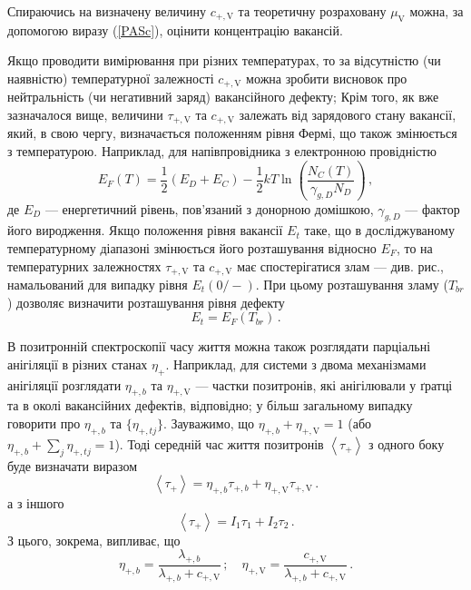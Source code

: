 \documentclass[10pt,a5paper,titlepage,oneside]{book}
\numberwithin{equation}{part}
\begin{document}
Спираючись на визначену величину $c_{+,\mathrm{V}}$ та теоретичну розраховану $\mu_\mathrm{V}$ можна,
за допомогою виразу (\ref{PASc}), оцінити концентрацію вакансій.

Якщо проводити вимірювання при різних температурах, то
за відсутністю (чи наявністю) температурної залежності $c_{+,\mathrm{V}}$ можна зробити
висновок про нейтральність (чи негативний заряд) вакансійного дефекту;
Крім того, як вже зазначалося вище, величини $\tau_{+,\mathrm{V}}$ та $c_{+,\mathrm{V}}$ залежать від зарядового стану
вакансії, який, в свою чергу, визначається положенням рівня Фермі, що також змінюється з температурою.
Наприклад, для напівпровідника з електронною провідністю
\begin{equation}\label{EF}
E_F(T)=\frac{1}{2}(E_D+E_C)-\frac{1}{2}kT\ln\left(\frac{N_C(T)}{\gamma_{g,D}N_D}\right)\,,
\end{equation}
де
$E_D$ --- енергетичний рівень, пов'язаний з донорною домішкою,
$\gamma_{g,D}$ --- фактор його виродження.
Якщо положення рівня вакансії $E_{t}$ таке, що
в досліджуваному температурному діапазоні змінюється його розташування
відносно $E_F$, то на температурних залежностях $\tau_{+,\mathrm{V}}$ та $c_{+,\mathrm{V}}$
має спостерігатися злам --- див. рис., намальований для випадку рівня  $E_t(0/-)$.
При цьому розташування зламу ($T_{br}$) дозволяє визначити розташування рівня дефекту
\begin{equation}
E_t =E_F(T_{br})\,.
\end{equation}

В позитронній спектроскопії часу життя можна також розглядати
парціальні анігіляції в різних станах $\eta_+$.
Наприклад,
для системи з двома механізмами анігіляції
розглядати $\eta_{+,b}$ та $\eta_{+,\mathrm{V}}$ ---
частки позитронів, які анігілювали у ґратці та в околі вакансійних
дефектів, відповідно;
у більш загальному випадку говорити про $\eta_{+,b}$ та $\{\eta_{+,tj}\}$.
Зауважимо, що $\eta_{+,b}+\eta_{+,\mathrm{V}}=1$ 
(або $\eta_{+,b}+\sum_j\eta_{+,tj}=1$).
Тоді середній час життя позитронів $\left\langle\tau_+\right\rangle$
з одного боку буде визначати виразом
\begin{equation*}
\left\langle\tau_+\right\rangle=\eta_{+,b}\tau_{+,b}+\eta_{+,\mathrm{V}}\tau_{+,\mathrm{V}}\,.
\end{equation*}
а з іншого
\begin{equation*}
\left\langle\tau_+\right\rangle=I_1\tau_{1}+I_2\tau_{2}\,.
\end{equation*}
З цього, зокрема, випливає, що
\begin{equation*}
\eta_{+,b}=\frac{\lambda_{+,b}}{\lambda_{+,b}+c_{+,\mathrm{V}}}\,;\quad
\eta_{+,\mathrm{V}}=\frac{c_{+,\mathrm{V}}}{\lambda_{+,b}+c_{+,\mathrm{V}}}\,.
\end{equation*}
\end{document}
